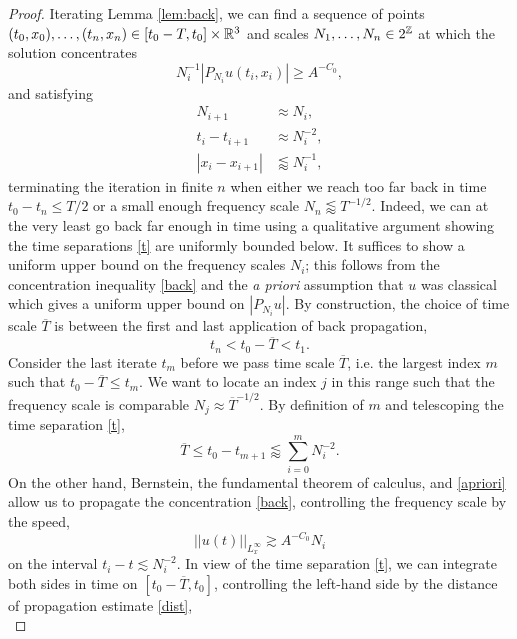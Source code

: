 \begin{proof}
	Iterating Lemma \ref{lem:back}, we can find a sequence of points $(t_0, x_0), \dots, (t_n, x_n) \in [t_0 - T, t_0] \times \mathbb R^3$ and scales $N_1, \dots, N_n \in 2^\mathbb Z$ at which the solution concentrates
		\begin{equation}
			N_i^{-1} |P_{N_i} u(t_i, x_i)| \geq A^{-C_0},\label{eq:back}
		\end{equation}
	and satisfying
		\begin{align}
			N_{i + 1}
				&\approx N_i,\label{eq:N}\\
			t_i - t_{i + 1}
				&\approx N_i^{-2},\label{eq:t}\\
			|x_{i} - x_{i + 1}|
				&\lessapprox N_i^{-1}\label{eq:x},
		\end{align}	
	terminating the iteration in finite $n$ when either we reach too far back in time $t_0 - t_n \leq T/2$ or a small enough frequency scale $N_n \lessapprox T^{-1/2}$. Indeed, we can at the very least go back far enough in time using a qualitative argument showing the time separations \eqref{t} are uniformly bounded below. It suffices to show a uniform upper bound on the frequency scales $N_i$; this follows from the concentration inequality \eqref{back} and the \textit{a priori} assumption that $u$ was classical which gives a uniform upper bound on $|P_{N_i} u|$. By construction, the choice of time scale $\overline T$ is between the first and last application of back propagation, 
		\[
			t_n < t_0 - \overline T < t_1.
		\]	
	Consider the last iterate $t_m$ before we pass time scale $\overline T$, i.e. the largest index $m$ such that $t_0 - \overline T \leq t_m$. We want to locate an index $j$ in this range such that the frequency scale is comparable $N_j \approx \overline T^{-1/2}$. By definition of $m$ and telescoping the time separation \eqref{t}, 
		\begin{equation}
			\overline T \leq t_0 - t_{m + 1} \lessapprox \sum_{i = 0}^m N_i^{-2}.\label{eq:l2}
		\end{equation}
	On the other hand, Bernstein, the fundamental theorem of calculus, and \eqref{apriori} allow us to propagate the concentration \eqref{back}, controlling the frequency scale by the speed,
		\[
			||u(t) ||_{L^\infty_x} \gtrsim A^{-C_0} N_i
		\]
	on the interval $t_i - t \lesssim N_i^{-2}$. In view of the time separation \eqref{t}, we can integrate both sides in time on $[t_0 - \overline T, t_0]$, controlling the left-hand side by the distance of propagation estimate \eqref{dist},
		\begin{equation}

\end{equation}
\end{proof}
